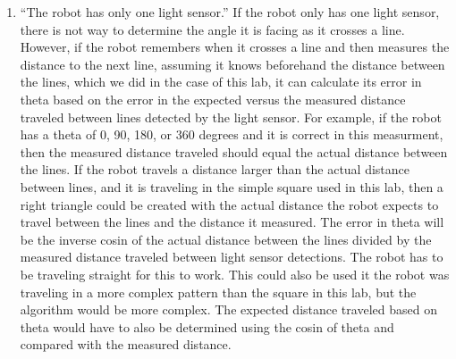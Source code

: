\documentclass[twocolumn]{article}
\begin{document}
\begin{enumerate}
\begin{enumerate}
\item ``The robot has only one light sensor.\cite{lab2}''
If the robot only has one light sensor, there is not way to determine the angle it is facing as it crosses a line. However, if the robot remembers when it crosses a line and then measures the distance to the next line, assuming it knows beforehand the distance between the lines, which we did in the case of this lab, it can calculate its error in theta based on the error in the expected versus the measured distance traveled between lines detected by the light sensor. For example, if the robot has a theta of 0, 90, 180, or 360 degrees and it is correct in this measurment, then the measured distance traveled should equal the actual distance between the lines. If the robot travels a distance larger than the actual distance between lines, and it is traveling in the simple square used in this lab, then a right triangle could be created with the actual distance the robot expects to travel between the lines and the distance it measured. The error in theta will be the inverse cosin of the actual distance between the lines divided by the measured distance traveled between light sensor detections. The robot has to be traveling straight for this to work. This could also be used it the robot was traveling in a more complex pattern than the square in this lab, but the algorithm would be more complex. The expected distance traveled based on theta would have to also be determined using the cosin of theta and compared with the measured distance.
\end{enumerate}
\end{enumerate}


\end{document}

